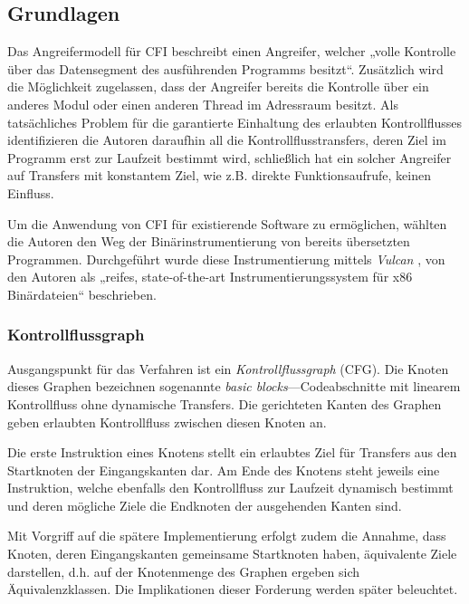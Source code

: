 \documentclass[11pt]{article}
\begin{document}
\subsection{Grundlagen}

Das Angreifermodell für CFI beschreibt einen Angreifer, welcher „volle
Kontrolle über das Datensegment des ausführenden Programms besitzt“. Zusätzlich
wird die Möglichkeit zugelassen, dass der Angreifer bereits die Kontrolle über
ein anderes Modul oder einen anderen Thread im Adressraum besitzt. Als
tatsächliches Problem für die garantierte Einhaltung des erlaubten
Kontrollflusses identifizieren die Autoren daraufhin all die
Kontrollflusstransfers, deren Ziel im Programm erst zur Laufzeit bestimmt wird,
schließlich hat ein solcher Angreifer auf Transfers mit konstantem Ziel, wie
z.B. direkte Funktionsaufrufe, keinen Einfluss.

Um die Anwendung von CFI für existierende Software zu ermöglichen, wählten die
Autoren den Weg der Binärinstrumentierung von bereits übersetzten Programmen.
Durchgeführt wurde diese Instrumentierung mittels \emph{Vulcan}
\cite{edwards-vulcan}, von den Autoren als „reifes, state-of-the-art
Instrumentierungssystem für x86 Binärdateien“ beschrieben.

\subsubsection{Kontrollflussgraph}

Ausgangspunkt für das Verfahren ist ein \emph{Kontrollflussgraph} (CFG). Die
Knoten dieses Graphen bezeichnen sogenannte \emph{basic blocks}—Codeabschnitte
mit linearem Kontrollfluss ohne dynamische Transfers. Die gerichteten Kanten
des Graphen geben erlaubten Kontrollfluss zwischen diesen Knoten an.

Die erste Instruktion eines Knotens stellt ein erlaubtes Ziel für Transfers aus
den Startknoten der Eingangskanten dar. Am Ende des Knotens steht jeweils eine
Instruktion, welche ebenfalls den Kontrollfluss zur Laufzeit dynamisch bestimmt
und deren mögliche Ziele die Endknoten der ausgehenden Kanten sind.

Mit Vorgriff auf die spätere Implementierung erfolgt zudem die Annahme, dass
Knoten, deren Eingangskanten gemeinsame Startknoten haben, äquivalente Ziele
darstellen, d.h. auf der Knotenmenge des Graphen ergeben sich
Äquivalenzklassen. Die Implikationen dieser Forderung werden später beleuchtet.
\end{document}
